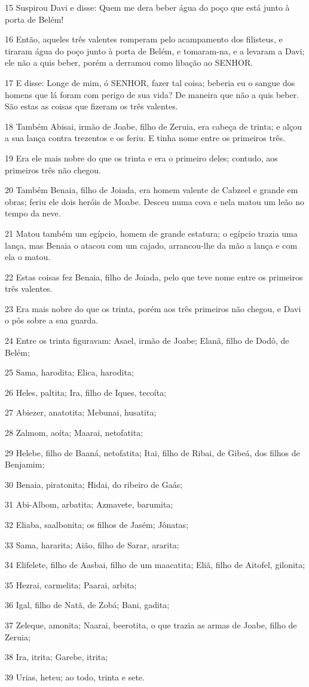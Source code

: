 \par 15 Suspirou Davi e disse: Quem me dera beber água do poço que está junto à porta de Belém!
\par 16 Então, aqueles três valentes romperam pelo acampamento dos filisteus, e tiraram água do poço junto à porta de Belém, e tomaram-na, e a levaram a Davi; ele não a quis beber, porém a derramou como libação ao SENHOR.
\par 17 E disse: Longe de mim, ó SENHOR, fazer tal coisa; beberia eu o sangue dos homens que lá foram com perigo de sua vida? De maneira que não a quis beber. São estas as coisas que fizeram os três valentes.
\par 18 Também Abisai, irmão de Joabe, filho de Zeruia, era cabeça de trinta; e alçou a sua lança contra trezentos e os feriu. E tinha nome entre os primeiros três.
\par 19 Era ele mais nobre do que os trinta e era o primeiro deles; contudo, aos primeiros três não chegou.
\par 20 Também Benaia, filho de Joiada, era homem valente de Cabzeel e grande em obras; feriu ele dois heróis de Moabe. Desceu numa cova e nela matou um leão no tempo da neve.
\par 21 Matou também um egípcio, homem de grande estatura; o egípcio trazia uma lança, mas Benaia o atacou com um cajado, arrancou-lhe da mão a lança e com ela o matou.
\par 22 Estas coisas fez Benaia, filho de Joiada, pelo que teve nome entre os primeiros três valentes.
\par 23 Era mais nobre do que os trinta, porém aos três primeiros não chegou, e Davi o pôs sobre a sua guarda.
\par 24 Entre os trinta figuravam: Asael, irmão de Joabe; Elanã, filho de Dodô, de Belém;
\par 25 Sama, harodita; Elica, harodita;
\par 26 Heles, paltita; Ira, filho de Iques, tecoíta;
\par 27 Abiezer, anatotita; Mebunai, husatita;
\par 28 Zalmom, aoíta; Maarai, netofatita;
\par 29 Helebe, filho de Baaná, netofatita; Itai, filho de Ribai, de Gibeá, dos filhos de Benjamim;
\par 30 Benaia, piratonita; Hidai, do ribeiro de Gaás;
\par 31 Abi-Albom, arbatita; Azmavete, barumita;
\par 32 Eliaba, saalbonita; os filhos de Jasém; Jônatas;
\par 33 Sama, hararita; Aião, filho de Sarar, ararita;
\par 34 Elifelete, filho de Aasbai, filho de um maacatita; Eliã, filho de Aitofel, gilonita;
\par 35 Hezrai, carmelita; Paarai, arbita;
\par 36 Igal, filho de Natã, de Zobá; Bani, gadita;
\par 37 Zeleque, amonita; Naarai, beerotita, o que trazia as armas de Joabe, filho de Zeruia;
\par 38 Ira, itrita; Garebe, itrita;
\par 39 Urias, heteu; ao todo, trinta e sete.

